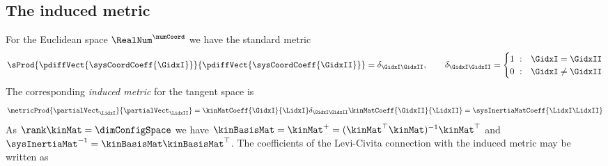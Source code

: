 \subsection{The induced metric}
For the Euclidean space $\RealNum^{\numCoord}$ we have the standard metric 
\begin{align}
 \sProd{\pdiffVect{\sysCoordCoeff{\GidxI}}}{\pdiffVect{\sysCoordCoeff{\GidxII}}} = \delta_{\GidxI\GidxII},
\qquad
 \delta_{\GidxI\GidxII} = \begin{cases} 1 \ : & \GidxI = \GidxII \\ 0 \ : & \GidxI \neq \GidxII \end{cases}
\end{align}
The corresponding \textit{induced metric} for the tangent space is
\begin{align}
 \metricProd{\partialVect_\LidxI}{\partialVect_\LidxII} = \kinMatCoeff{\GidxI}{\LidxI} \delta_{\GidxI\GidxII} \kinMatCoeff{\GidxII}{\LidxII} = \sysInertiaMatCoeff{\LidxI\LidxII}
\end{align}
As $\rank\kinMat=\dimConfigSpace$ we have $\kinBasisMat = \kinMat^+ = (\kinMat^\top \kinMat)^{-1}\kinMat^\top$ and $\sysInertiaMat^{-1} = \kinBasisMat \kinBasisMat^\top$.
The coefficients of the Levi-Civita connection with the induced metric may be written as
